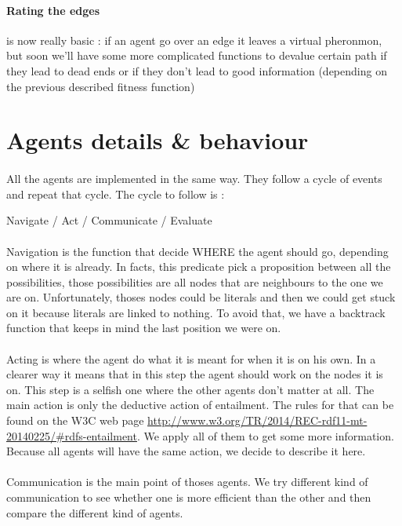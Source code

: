 \documentclass{article}
\begin{document}
		\paragraph{Rating the edges} is now really basic : if an agent go over an edge it leaves a virtual pheronmon,
			but soon we'll have some more complicated functions to devalue certain path if they lead to dead ends or
			if they don't lead to good information (depending on the previous described fitness function)

\section{Agents details \& behaviour}
	\paragraph{}
		All the agents are implemented in the same way.
		They follow a cycle of events and repeat that cycle.
		The cycle to follow is :
	\begin{center}
		Navigate / Act / Communicate / Evaluate
	\end{center}
	\paragraph{}
		Navigation is the function that decide WHERE the agent should go, depending on where it is already.
		In facts, this predicate pick a proposition between all the possibilities,
		those possibilities are all nodes that are neighbours to the one we are on.
		Unfortunately, thoses nodes could be literals and then we could get stuck on it because literals are linked to nothing.
		To avoid that, we have a backtrack function that keeps in mind the last position we were on.
	\paragraph{}
		Acting is where the agent do what it is meant for when it is on his own.
		In a clearer way it means that in this step the agent should work on the nodes it is on.
		This step is a selfish one where the other agents don't matter at all.
		The main action is only the deductive action of entailment.
		The rules for that can be found on the W3C web page \url{http://www.w3.org/TR/2014/REC-rdf11-mt-20140225/#rdfs-entailment}.
		We apply all of them to get some more information.
		Because all agents will have the same action, we decide to describe it here.
	\paragraph{}
		Communication is the main point of thoses agents.
		We try different kind of communication to see whether one is more efficient than the other
		and then compare the different kind of agents.
\end{document}
